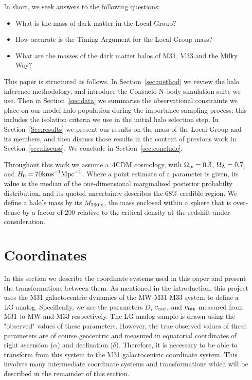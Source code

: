 \documentclass[iop,apj]{emulateapj}
\newcommand{\LCDM}{$\Lambda$CDM }
\def\distance{D}
\def\vrad{v_{\rm rad}}
\def\vtan{v_{\rm tan}}
\newcommand{\Mpc}{{\rm Mpc}}
\newcommand{\kms}{{\rm km s}^{-1}}
\newcommand{\consuelo}{{\sc Consuelo }}
\def\Sref#1{Section~\ref{#1}}
\begin{document}
In short, we seek answers to the following questions:
\begin{itemize}
\item What is the mass of dark matter in the Local Group?
\item How accurate is the Timing Argument for the Local Group mass?
\item What are the masses of the dark matter halos of M31, M33 and the Milky
Way?
\end{itemize}

This paper is structured as follows. In \Sref{sec:method} we review the
halo inference methodology, and introduce the \consuelo N-body
simulation suite we use. Then in \Sref{sec:data} we summarise the
observational constraints we place on our model halo population during
the importance sampling process: this includes the isolation criteria we
use in the initial halo selection step. In \Sref{Sec:results} we present
our results on the mass of the Local Group and its members, and then
discuss those results in the context of previous work in
\Sref{sec:discuss}. We conclude in \Sref{sec:conclude}.

Throughout this work we assume a \LCDM cosmology, with $\Omega_{\rm m} =
0.3$, $\Omega_{\rm \Lambda} = 0.7$, and $H_0 = 70 \kms \Mpc^{-1}$. Where
a point estimate of a parameter is given, its value is the median of the
one-dimensional marginalised posterior probabilty distribution, and its
quoted uncertainty describes the 68\% credible region.
We define a halo's mass by its $M_{200,\rm c}$, the mass enclosed within a
sphere that is over-dense by a factor of 200 relative to the critical density
at the redshift under consideration.


\section{Coordinates}
\label{sec:coord}

In this section we describe the coordinate systems used in this paper and present the transformations between them.  As mentioned in the introduction, this project uses the M31 galactocentric dynamics of the MW-M31-M33 system to define a LG analog.  Specifically, we use the parameters $\distance$, $\vrad$, and $\vtan$ measured from M31 to MW and M33 respectively.  The LG analog sample is drawn using the "observed" values of these parameters.  However, the true observed values of these parameters are of course geocentric and measured in equatorial coordinates of right ascension ($\alpha$) and declination ($\delta$).  Therefore, it is necessary to be able to transform from this system to the M31 galactocentric coordinate system.  This involves many intermediate coordinate systems and transformations which will be described in the remainder of this section.
\end{document}
